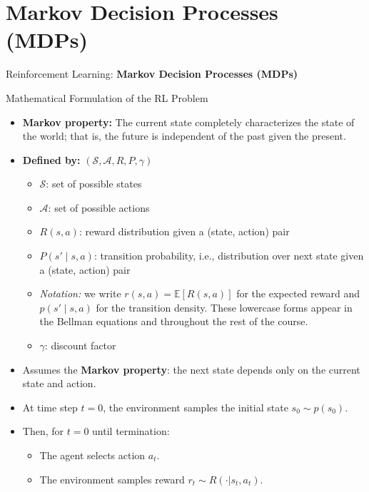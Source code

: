 \section{Markov Decision Processes (MDPs)}
\begin{frame}{}
    \LARGE Reinforcement Learning: \textbf{Markov Decision Processes (MDPs)}
\end{frame}

\begin{frame}[allowframebreaks]{Mathematical Formulation of the RL Problem}
    \begin{itemize}
        \item \textbf{Markov property:} The current state completely characterizes the state of the world; that is, the future is independent of the past given the present.
        \item \textbf{Defined by:} $(\mathcal{S}, \mathcal{A}, R, P, \gamma)$
        \begin{itemize}
            \item $\mathcal{S}$: set of possible states
            \item $\mathcal{A}$: set of possible actions
\item $R(s,a)$: reward distribution given a (state, action) pair
        \item $P(s' \mid s, a)$: transition probability, i.e., distribution over next state given a (state, action) pair
        \item \textit{Notation:} we write $r(s,a) = \mathbb{E}[R(s,a)]$ for the expected reward and $p(s' \mid s,a)$ for the transition density. These lowercase forms appear in the Bellman equations and throughout the rest of the course.
            \item $\gamma$: discount factor
        \end{itemize}
        \item Assumes the \textbf{Markov property}: the next state depends only on the current state and action.
    \end{itemize}
\framebreak
    \begin{itemize}
        \item At time step $t = 0$, the environment samples the initial state $s_0 \sim p(s_0)$.
        \item Then, for $t = 0$ until termination:
        \begin{itemize}
            \item The agent selects action $a_t$.
            \item The environment samples reward $r_t \sim R(\cdot|s_t, a_t)$.

\end{itemize}
\end{itemize}
\end{frame}
